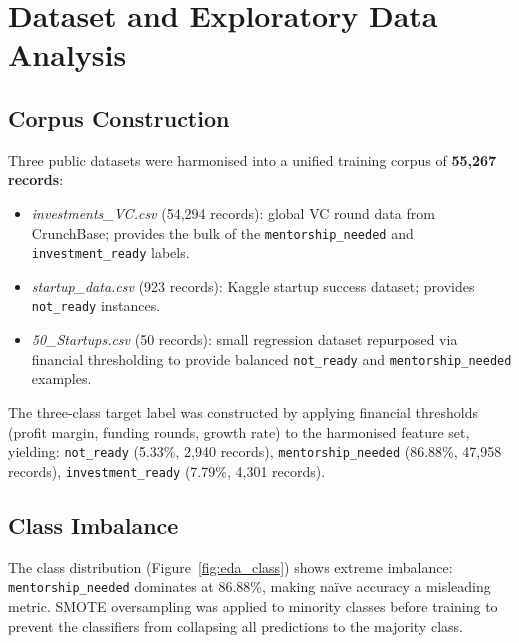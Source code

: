 \documentclass{article}
\begin{document}

\FloatBarrier
\section{Dataset and Exploratory Data Analysis}
\label{sec:eda}

\FloatBarrier
\subsection{Corpus Construction}

Three public datasets were harmonised into a unified training corpus of
\textbf{55{,}267 records}:
\begin{itemize}
    \item \textit{investments\_VC.csv} (54{,}294 records): global VC round
    data from CrunchBase; provides the bulk of the \texttt{mentorship\_needed}
    and \texttt{investment\_ready} labels.
    \item \textit{startup\_data.csv} (923 records): Kaggle startup success
    dataset; provides \texttt{not\_ready} instances.
    \item \textit{50\_Startups.csv} (50 records): small regression dataset
    repurposed via financial thresholding to provide balanced \texttt{not\_ready}
    and \texttt{mentorship\_needed} examples.
\end{itemize}
The three-class target label was constructed by applying financial thresholds
(profit margin, funding rounds, growth rate) to the harmonised feature set,
yielding:
\texttt{not\_ready} (5.33\%, 2{,}940 records),
\texttt{mentorship\_needed} (86.88\%, 47{,}958 records),
\texttt{investment\_ready} (7.79\%, 4{,}301 records).

\FloatBarrier
\subsection{Class Imbalance}

The class distribution (Figure~\ref{fig:eda_class}) shows extreme imbalance:
\texttt{mentorship\_needed} dominates at 86.88\%, making na\"ive accuracy a
misleading metric. SMOTE oversampling was applied to minority classes before
training to prevent the classifiers from collapsing all predictions to the
majority class.
\end{document}

